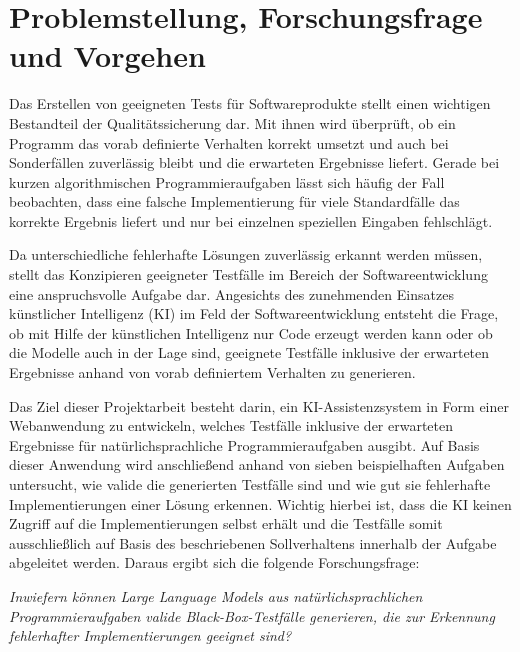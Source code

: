 \section{Problemstellung, Forschungsfrage und Vorgehen}
Das Erstellen von geeigneten Tests für Softwareprodukte stellt einen wichtigen Bestandteil der Qualitätssicherung dar. Mit ihnen wird überprüft, ob ein Programm
das vorab definierte Verhalten korrekt umsetzt und auch bei Sonderfällen zuverlässig bleibt und die erwarteten Ergebnisse liefert. Gerade bei kurzen algorithmischen 
Programmieraufgaben lässt sich häufig der Fall beobachten, dass eine falsche Implementierung für viele Standardfälle das korrekte Ergebnis liefert und nur 
bei einzelnen speziellen Eingaben fehlschlägt.

Da unterschiedliche fehlerhafte Lösungen zuverlässig erkannt werden müssen, stellt das Konzipieren geeigneter Testfälle im Bereich der Softwareentwicklung eine 
anspruchsvolle Aufgabe dar. Angesichts des zunehmenden Einsatzes künstlicher Intelligenz (\acs{KI}) im Feld der Softwareentwicklung entsteht die Frage, ob mit Hilfe der künstlichen Intelligenz 
nur Code erzeugt werden kann oder ob die Modelle auch in der Lage sind, geeignete Testfälle inklusive der erwarteten Ergebnisse anhand von vorab definiertem Verhalten 
zu generieren.

Das Ziel dieser Projektarbeit besteht darin, ein \ac{KI}-Assistenzsystem in Form einer Webanwendung zu entwickeln, welches Testfälle inklusive der erwarteten Ergebnisse 
für natürlichsprachliche Programmieraufgaben ausgibt. Auf Basis dieser Anwendung wird anschließend anhand von sieben beispielhaften Aufgaben untersucht, wie valide die generierten 
Testfälle sind und wie gut sie fehlerhafte Implementierungen einer Lösung erkennen. Wichtig hierbei ist, dass die \ac{KI} keinen Zugriff auf die Implementierungen selbst erhält und 
die Testfälle somit ausschließlich auf Basis des beschriebenen Sollverhaltens innerhalb der Aufgabe abgeleitet werden. Daraus ergibt sich die folgende Forschungsfrage:

\begin{center}
    \textit{Inwiefern können Large Language Models aus natürlichsprachlichen Programmieraufgaben valide Black-Box-Testfälle generieren, die zur Erkennung fehlerhafter Implementierungen 
geeignet sind?}
\end{center}

